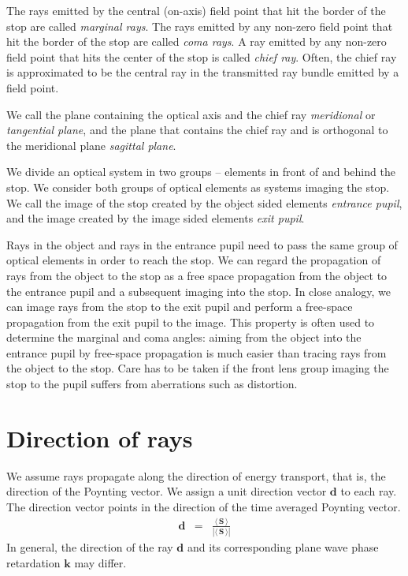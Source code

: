 \documentclass[12pt,a4paper,twoside,openright,BCOR10mm,headsepline,titlepage,abstracton,chapterprefix,final]{scrreprt}
\newcommand\Vector[1]{{\mathbf{#1}}}
\newcommand{\timeavg}[1]{{\langle\,#1\,\rangle}}
\begin{document}
The rays emitted by the central (on-axis) field point that hit the border of the stop are called \emph{marginal rays}.
The rays emitted by any non-zero field point that hit the border of the stop are called \emph{coma rays}.
A ray emitted by any non-zero field point that hits the center of the stop is called \emph{chief ray}.
Often, the chief ray is approximated to be the central ray in the transmitted ray bundle emitted by a field point.

We call the plane containing the optical axis and the chief ray \emph{meridional} or \emph{tangential plane}, and the plane that contains the chief ray and is orthogonal to the meridional plane \emph{sagittal plane}.

We divide an optical system in two groups -- elements in front of and behind the stop. 
We consider both groups of optical elements as systems imaging the stop.
We call the image of the stop created by the object sided elements \emph{entrance pupil}, and the image created by the image sided elements \emph{exit pupil}.

Rays in the object and rays in the entrance pupil need to pass the same group of optical elements in order to reach the stop. 
We can regard the propagation of rays from the object to the stop as a free space propagation from the object to the entrance pupil and a subsequent imaging into the stop.
In close analogy, we can image rays from the stop to the exit pupil and perform a free-space propagation from the exit pupil to the image.
This property is often used to determine the marginal and coma angles: 
aiming from the object into the entrance pupil by free-space propagation is much easier than tracing rays from the object to the stop.
Care has to be taken if the front lens group imaging the stop to the pupil suffers from aberrations such as distortion.



\section{Direction of rays}
We assume rays propagate along the direction of energy transport, that is, the direction of the Poynting vector.
We assign a unit direction vector $\Vector{d}$ to each ray.
The direction vector points in the direction of the time averaged Poynting vector.
\begin{eqnarray}
 \Vector{d} &=& \frac{\timeavg{\Vector{S}}}{|\timeavg{\Vector{S}}|}
\end{eqnarray}
In general, the direction of the ray $\Vector{d}$ and its corresponding plane wave phase retardation $\Vector{k}$ may differ.
\end{document}
